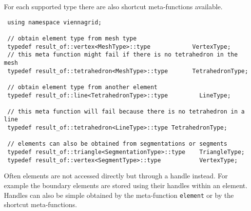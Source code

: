 For each supported type there are also shortcut meta-functions available.

\begin{lstlisting}
 using namespace viennagrid;

 // obtain element type from mesh type
 typedef result_of::vertex<MeshType>::type            VertexType;
 // this meta function might fail if there is no tetrahedron in the mesh
 typedef result_of::tetrahedron<MeshType>::type       TetrahedronType;

 // obtain element type from another element
 typedef result_of::line<TetrahedronType>::type         LineType;

 // this meta function will fail because there is no tetrahedron in a line
 typedef result_of::tetrahedron<LineType>::type TetrahedronType;

 // elements can also be obtained from segmentations or segments
 typedef result_of::triangle<SegmentationType>::type    TriangleType;
 typedef result_of::vertex<SegmentType>::type           VertexType;
\end{lstlisting}

\pagebreak

Often elements are not accessed directly but through a handle instead. For example the boundary elements are stored using their handles within an element. Handles can also be simple obtained by the meta-function \lstinline|element| or by the shortcut meta-functions.


